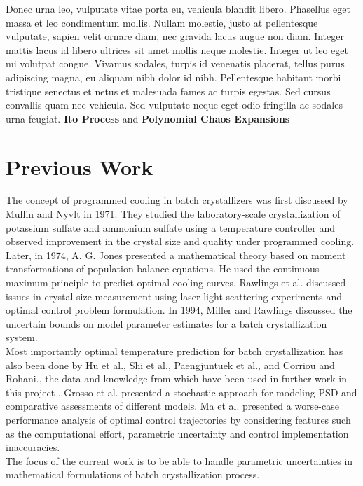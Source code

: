 Donec urna leo, vulputate vitae porta eu, vehicula blandit libero. Phasellus eget massa et leo condimentum mollis. Nullam molestie, justo at pellentesque vulputate, sapien velit ornare diam, nec gravida lacus augue non diam. Integer mattis lacus id libero ultrices sit amet mollis neque molestie. Integer ut leo eget mi volutpat congue. Vivamus sodales, turpis id venenatis placerat, tellus purus adipiscing magna, eu aliquam nibh dolor id nibh. Pellentesque habitant morbi tristique senectus et netus et malesuada fames ac turpis egestas. Sed cursus convallis quam nec vehicula. Sed vulputate neque eget odio fringilla ac sodales urna feugiat.
\textbf{Ito Process} and \textbf{Polynomial Chaos Expansions}


\section{Previous Work}

The concept of programmed cooling in batch crystallizers was first discussed by Mullin and Nyvlt \cite{mullin} in 1971. They studied the laboratory-scale crystallization of potassium sulfate and ammonium sulfate using a temperature controller and observed improvement in the crystal size and quality under programmed cooling. \\
Later, in 1974, A. G. Jones \cite{agjones} presented a mathematical theory based on moment transformations of population balance equations. He used the continuous maximum principle to predict optimal cooling curves.
Rawlings et al. \cite{rawlings} discussed issues in crystal size measurement using laser light scattering experiments and optimal control problem formulation. In 1994, Miller and Rawlings \cite{miller_rawlings}  discussed the uncertain bounds on model parameter estimates for a batch crystallization system.\\ 
Most importantly optimal temperature prediction for batch crystallization has also been done by Hu et al.\cite{hu}, Shi et al.\cite{shi}, Paengjuntuek et al.\cite{paeng}, and Corriou and Rohani.\cite{corriou}, the data and knowledge from which have been used in further work in this project . Grosso et al.\cite{grosso} presented a stochastic approach for modeling PSD and comparative assessments of different models. Ma et al.\cite{ma} presented a worse-case performance analysis of optimal control trajectories by considering features such as the computational effort, parametric uncertainty and control implementation inaccuracies. \\
The focus of the current work is to be able to handle parametric uncertainties in mathematical formulations of batch crystallization process.
